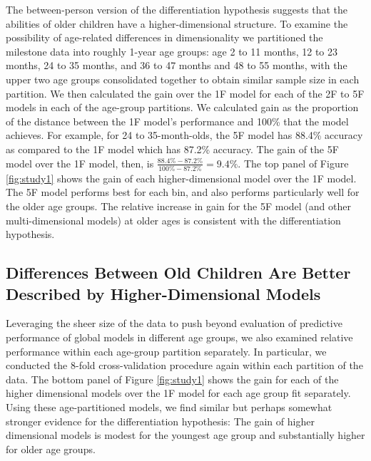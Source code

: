 \documentclass[man]{apa7}
\begin{document}
The between-person version of the differentiation
hypothesis suggests that the abilities of older children have a
higher-dimensional structure. To examine the possibility of age-related differences in dimensionality we partitioned
the milestone data into roughly 1-year age groups: age 2 to 11 months,
12 to 23 months, 24 to 35 months, and 36 to 47 months and 48 to 55
months, with the upper two age groups consolidated together to
obtain similar sample size in each partition. We then calculated the gain
over the 1F model for each of the 2F to 5F models in each of the age-group partitions.
We calculated gain as the proportion of the distance between the 1F
model's performance and 100\% that the model achieves. For example, for
24 to 35-month-olds, the 5F model has 88.4\% accuracy as compared to the
1F model which has 87.2\% accuracy. The gain of the 5F model over the 1F
model, then, is \(\frac{88.4\% - 87.2\%}{100\% - 87.2\%} = 9.4\%\). The
top panel of Figure \ref{fig:study1} shows the gain of each
higher-dimensional model over the 1F model. The 5F model performs best
for each bin, and also performs particularly well for the older age
groups. The relative increase in gain for the 5F model (and other multi-dimensional models) at older ages is
consistent with the differentiation hypothesis.


\hypertarget{differences-between-old-children-are-better-described-by-higher-dimensional-models}{%
\subsection*{Differences Between Old Children Are Better Described by
Higher-Dimensional
Models}\label{differences-between-old-children-are-better-described-by-higher-dimensional-models}}

Leveraging the sheer size of the data to push beyond evaluation of predictive performance of global models in different age groups, we also examined relative performance within each age-group partition separately. In particular, we conducted the 8-fold cross-validation procedure again within each partition of the data. The bottom panel of Figure \ref{fig:study1} shows the gain for
each of the higher dimensional models over the 1F model for each age
group fit separately. Using these age-partitioned models, we find similar but perhaps somewhat stronger evidence for the differentiation hypothesis: The gain of higher dimensional
models is modest for the youngest age group and substantially higher  for
older age groups.
\end{document}
